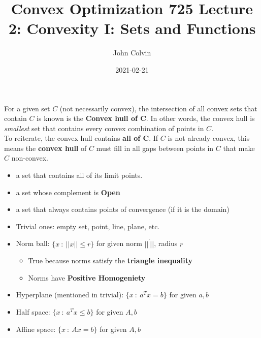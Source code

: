 \documentclass{article}
\title{Convex Optimization 725 Lecture 2: Convexity I: Sets and Functions}
\date{2021-02-21}
\author{John Colvin}
\begin{document}
\maketitle

\begin{definition}
  For a given set $C$ (not necessarily convex), the intersection of all convex
  sets that contain $C$ is known is the \textbf{Convex hull of C}.  In other words,
  the convex hull is \textit{smallest} set that contains every convex
  combination of points in $C$.\\
  \vpush
  To reiterate, the convex hull contains \textbf{all of C}.  If $C$ is not already
  convex, this means the \textbf{convex hull} of $C$ must fill in all gaps between
  points in $C$ that make $C$ non-convex.
\end{definition}
\begin{definition}
  \begin{itemize}
    \item a set that contains all of its limit points.
    \item a set whose complement is \textbf{Open}
    \item a set that always contains points of convergence (if it is the domain)
  \end{itemize}
\end{definition}
\begin{headered_note}
  \begin{itemize}
    \item Trivial ones: empty set, point, line, plane, etc.
    \item Norm ball: $\{x~:~||x||\leq r\}$ for given norm $||~\dot||$, radius $r$
          \begin{itemize}
            \item True because norms satisfy the \textbf{triangle inequality}
            \item Norms have \textbf{Positive Homogeniety}
          \end{itemize}
    \item Hyperplane (mentioned in trivial): $\{x~:~a^Tx=b\}$ for given $a,b$
    \item Half space: $\{x~:~a^Tx\leq b\}$ for given $A,b$
    \item Affine space: $\{x~:~Ax=b\}$ for given $A,b$
  \end{itemize}
\end{headered_note}
\pagebreak
\end{document}
